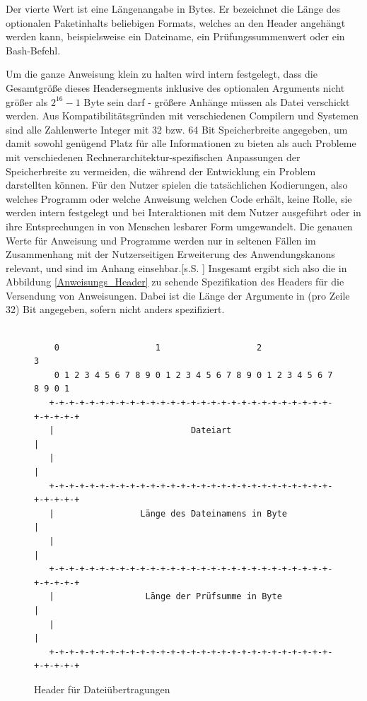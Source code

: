 Der vierte Wert ist eine Längenangabe in Bytes.
Er bezeichnet die Länge des optionalen Paketinhalts beliebigen Formats, welches an den Header angehängt werden kann, beispielsweise ein Dateiname, ein Prüfungssummenwert oder ein Bash-Befehl.\par
Um die ganze Anweisung klein zu halten wird intern festgelegt, dass die Gesamtgröße dieses Headersegments inklusive des optionalen Arguments nicht größer als $2^{16}-1$ Byte sein darf - größere Anhänge müssen als Datei verschickt werden.
Aus Kompatibilitätsgründen mit verschiedenen Compilern und Systemen sind alle Zahlenwerte Integer mit 32 bzw. 64 Bit Speicherbreite angegeben, um damit sowohl genügend Platz für alle Informationen zu bieten als auch Probleme mit verschiedenen Rechnerarchitektur-spezifischen Anpassungen der Speicherbreite zu vermeiden, die während der Entwicklung ein Problem darstellten können.
Für den Nutzer spielen die tatsächlichen Kodierungen, also welches Programm oder welche Anweisung welchen Code erhält, keine Rolle, sie werden intern festgelegt und bei  Interaktionen mit dem Nutzer ausgeführt oder in ihre Entsprechungen in von Menschen lesbarer Form umgewandelt.
Die genauen Werte für Anweisung und Programme werden nur in seltenen Fällen im Zusammenhang mit der Nutzerseitigen Erweiterung des Anwendungskanons relevant, und sind im Anhang einsehbar.[s.S. \pageref{enums}]
Insgesamt ergibt sich also die in Abbildung \ref{Anweisungs_Header} zu sehende Spezifikation des Headers für die Versendung von Anweisungen.
Dabei ist die Länge der Argumente in (pro Zeile 32) Bit angegeben, sofern nicht anders spezifiziert.\\\\

\begin{figure}[h]
\begin{lstlisting}
	0                   1                   2                   3
    0 1 2 3 4 5 6 7 8 9 0 1 2 3 4 5 6 7 8 9 0 1 2 3 4 5 6 7 8 9 0 1
   +-+-+-+-+-+-+-+-+-+-+-+-+-+-+-+-+-+-+-+-+-+-+-+-+-+-+-+-+-+-+-+-+
   |                           Dateiart                            |
   |                                                               |
   +-+-+-+-+-+-+-+-+-+-+-+-+-+-+-+-+-+-+-+-+-+-+-+-+-+-+-+-+-+-+-+-+
   |                 Länge des Dateinamens in Byte                 |
   |                                                               |
   +-+-+-+-+-+-+-+-+-+-+-+-+-+-+-+-+-+-+-+-+-+-+-+-+-+-+-+-+-+-+-+-+
   |                  Länge der Prüfsumme in Byte                  |
   |                                                               |
   +-+-+-+-+-+-+-+-+-+-+-+-+-+-+-+-+-+-+-+-+-+-+-+-+-+-+-+-+-+-+-+-+
\end{lstlisting}
\caption{Header für Dateiübertragungen}
\label{Datei_Header}
\end{figure}

